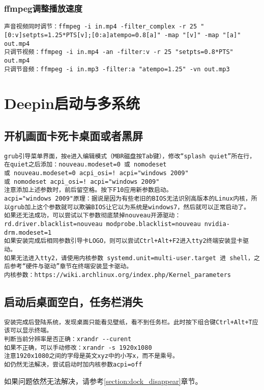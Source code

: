 \documentclass[a4paper,fontset=fandol,zihao=-4,linespread=1.2]{ctexbook}
\begin{document}
\subsection{ffmpeg调整播放速度}
\begin{lstlisting}
声音视频同时调节：ffmpeg -i in.mp4 -filter_complex -r 25 "[0:v]setpts=1.25*PTS[v];[0:a]atempo=0.8[a]" -map "[v]" -map "[a]" out.mp4
只调节视频：ffmpeg -i in.mp4 -an -filter:v -r 25 "setpts=0.8*PTS" out.mp4
只调节音频：ffmpeg -i in.mp3 -filter:a "atempo=1.25" -vn out.mp3
\end{lstlisting}


\chapter{Deepin启动与多系统}

\section{开机画面卡死卡桌面或者黑屏}
\begin{lstlisting}
grub引导菜单界面，按e进入编辑模式（MBR磁盘按Tab键），修改“splash quiet”所在行，在quiet之后添加：nouveau.modeset=0 或 nomodeset
或 nouveau.modeset=0 acpi_osi=! acpi="windows 2009"
或 nomodeset acpi_osi=! acpi="windows 2009"
注意添加上述参数时，前后留空格。按下F10应用新参数启动。
acpi="windows 2009"原理：据说是因为有些老旧的BIOS无法识别高版本的Linux内核，所以grub加上这个参数就可以欺骗BIOS让它以为系统是windows7，然后就可以正常启动了。
如果还无法成功，可以尝试以下参数彻底禁掉nouveau开源驱动：
rd.driver.blacklist=nouveau modprobe.blacklist=nouveau nvidia-drm.modeset=1
如果安装完成后相同参数引导卡LOGO，则可以尝试Ctrl+Alt+F2进入tty2终端安装显卡驱动。
如果无法进入tty2，请使用内核参数 systemd.unit=multi-user.target 进 shell，之后参考“硬件与驱动”章节在终端安装显卡驱动。
内核参数：https://wiki.archlinux.org/index.php/Kernel_parameters
\end{lstlisting}

\section{启动后桌面空白，任务栏消失}
\begin{lstlisting}
安装完成后登陆系统，发现桌面只能看见壁纸，看不到任务栏。此时按下组合键Ctrl+Alt+T应该可以显示终端。
判断当前分辨率是否正确：xrandr --curent
如果不正确，可以手动修改：xrandr -s 1920x1080
注意1920x1080之间的字母是英文xyz中的小写x，而不是乘号。
如仍然无法解决，尝试启动时加内核参数acpi=off
\end{lstlisting}
如果问题依然无法解决，请参考\ref{section:dock_disappear}章节。
\end{document}
